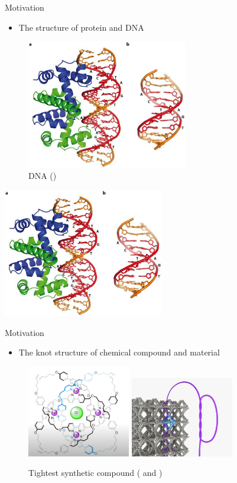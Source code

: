 \begin{frame}{Motivation}
	\begin{itemize}
		\item The structure of protein and DNA
	\end{itemize}
	\begin{figure}
		\centering
		\includegraphics[width=7cm]{Pictures/DNA.png}
		\caption{DNA (\cite{DNA})}
		\label{fig:enter-label}
	\end{figure}
	\centering
	\includegraphics[width=7cm]{Pictures/DNA.png}
\end{frame}

\begin{frame}{Motivation}
	\begin{itemize}
		\item The knot structure of chemical compound and material
	\end{itemize}
	\begin{figure}
		\centering
		\includegraphics[width = 4.5cm]{Pictures/chemical.png}
		\includegraphics[width=4.5cm]{Pictures/material.jpg}
		\caption{Tightest synthetic compound (\cite{compound} and \cite{farbric})}
		\label{fig:enter-label}
	\end{figure}
	
\end{frame}

